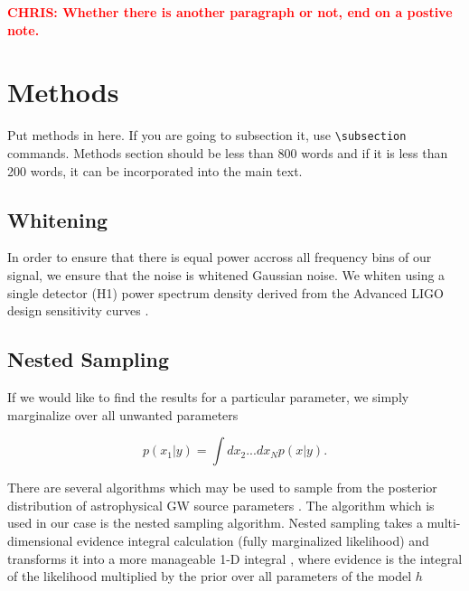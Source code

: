 \documentclass[%
showpacs,
 amsmath,amssymb,
 aps,
 twocolumn,
 prl,
 reprint,
floatfix,
]{revtex4-1}
\newcommand{\chris}[1]{\textbf{\textcolor{red}{CHRIS: #1}}}
\begin{document}
\chris{Whether there is another paragraph or not, end on a postive note.}

\section{Methods}
%
Put methods in here.  If you are going to subsection it, use
\verb|\subsection| commands.  Methods section should be less than
800 words and if it is less than 200 words, it can be incorporated
into the main text.

\subsection{Whitening} \label{whiten_sec}

In order to ensure 
that there is equal power accross all
frequency bins of our signal, we ensure that the noise is whitened Gaussian
noise. We whiten using a single detector (H1) power spectrum density derived from the
Advanced LIGO design sensitivity curves \cite{2016LRR....19....1A}. 

\subsection{Nested Sampling} \label{nested_sec}
%
%
If we would like to find the results for a particular parameter, 
we simply marginalize over all unwanted parameters 

\begin{equation}
    p(x_1|y) = \int dx_2 ... dx_N p(x|y).
\end{equation}

There are several algorithms which may be used to sample from the posterior
distribution of astrophysical GW source parameters \cite{PhysRevD.64.022001,
skilling2006,10.1111/j.1365-2966.2011.20288.x}. The
algorithm which is used in our case is the nested sampling algorithm. Nested
sampling takes a multi-dimensional evidence integral calculation (fully
marginalized likelihood) and transforms it into a more manageable 1-D integral
, where evidence is the integral of the likelihood 
multiplied by the prior over all parameters of the model $h$ ~\cite{1409.7215}
\end{document}
